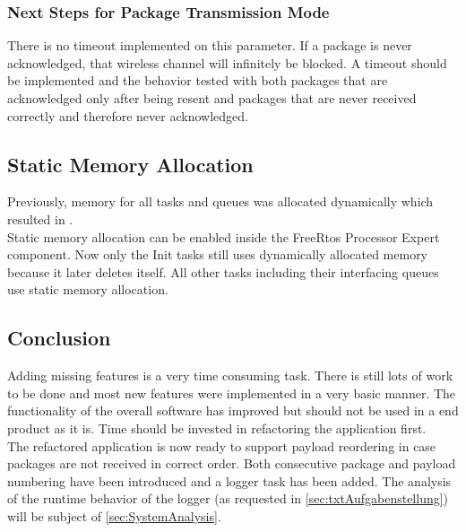 \subsubsection{Next Steps for Package Transmission Mode}
There is no timeout implemented on this parameter. If a package is never acknowledged, that wireless channel will infinitely be blocked. A timeout should be implemented and the behavior tested with both packages that are acknowledged only after being resent and packages that are never received correctly and therefore never acknowledged.
%
%
\subsection{Static Memory Allocation}
Previously, memory for all tasks and queues was allocated dynamically which resulted in .\\
Static memory allocation can be enabled inside the FreeRtos Processor Expert component. Now only the Init tasks still uses dynamically allocated memory because it later deletes itself. All other tasks including their interfacing queues use static memory allocation.
%
%
\subsection{Conclusion}
Adding missing features is a very time consuming task. There is still lots of work to be done and most new features were implemented in a very basic manner. The functionality of the overall software has improved but should not be used in a end product as it is. Time should be invested in refactoring the application first.\\
The refactored application is now ready to support payload reordering in case packages are not received in correct order. Both consecutive package and payload numbering have been introduced and a logger task has been added. The analysis of the runtime behavior of the logger (as requested in \autoref{sec:txtAufgabenstellung}) will be subject of \autoref{sec:SystemAnalysis}.
